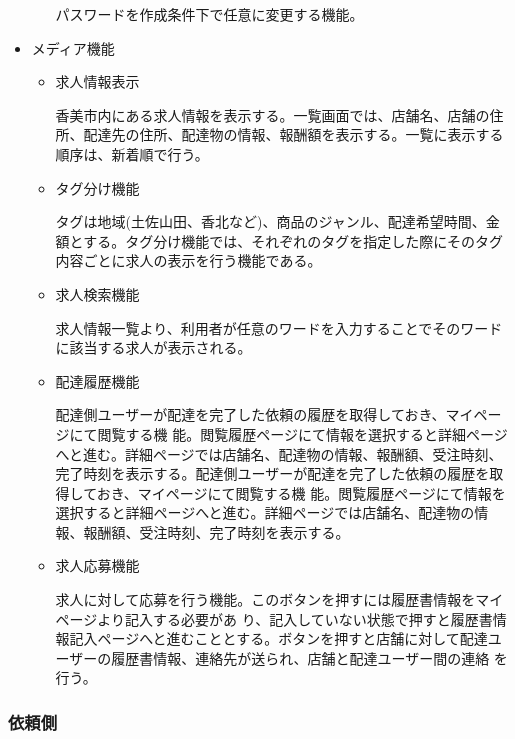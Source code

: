 \begin{itemize}
\begin{itemize}
        パスワードを作成条件下で任意に変更する機能。
        
    \end{itemize}
  \item メディア機能
  \begin{itemize}
      \item 求人情報表示
      
      香美市内にある求人情報を表示する。一覧画面では、店舗名、店舗の住所、配達先の住所、配達物の情報、報酬額を表示する。一覧に表示する順序は、新着順で行う。

      
      \item タグ分け機能
      
      タグは地域(土佐山田、香北など)、商品のジャンル、配達希望時間、金額とする。タグ分け機能では、それぞれのタグを指定した際にそのタグ内容ごとに求人の表示を行う機能である。
      
      \item 求人検索機能
      
      求人情報一覧より、利用者が任意のワードを入力することでそのワードに該当する求人が表示される。
    
      
      \item 配達履歴機能
      
      配達側ユーザーが配達を完了した依頼の履歴を取得しておき、マイページにて閲覧する機 能。閲覧履歴ページにて情報を選択すると詳細ページへと進む。詳細ページでは店舗名、配達物の情報、報酬額、受注時刻、完了時刻を表示する。配達側ユーザーが配達を完了した依頼の履歴を取得しておき、マイページにて閲覧する機 能。閲覧履歴ページにて情報を選択すると詳細ページへと進む。詳細ページでは店舗名、配達物の情報、報酬額、受注時刻、完了時刻を表示する。
      \item 求人応募機能
      
      求人に対して応募を行う機能。このボタンを押すには履歴書情報をマイページより記入する必要があ り、記入していない状態で押すと履歴書情報記入ページへと進むこととする。ボタンを押すと店舗に対して配達ユーザーの履歴書情報、連絡先が送られ、店舗と配達ユーザー間の連絡 を行う。
  \end{itemize}
\end{itemize}


\subsubsection{依頼側}

